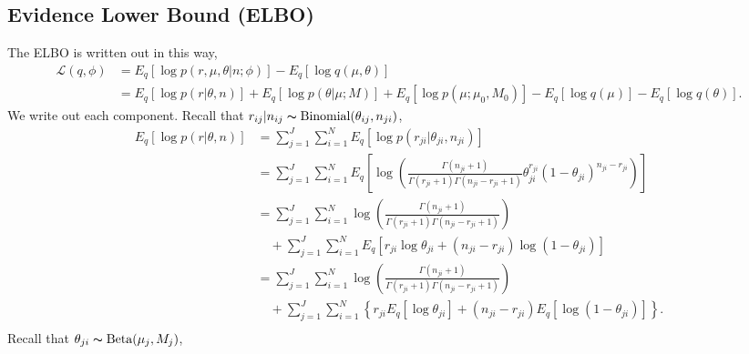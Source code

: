 \documentclass[11pt,reqno]{amsart}
\begin{document}
\subsection{Evidence Lower Bound (ELBO)}
\label{appendix:ELBO}
The ELBO is written out in this way,
\begin{equation}
\begin{split}
\label{L}
\mathcal{L}(q, \phi) &= E_q \left[ \log p\left(r,\mu,\theta | n; \phi \right)\right] - E_q \left[ \log q\left(\mu,\theta \right)\right] \\
&= E_q \left[ \log p\left(r | \theta, n \right)\right] + E_q \left[ \log p\left(\theta | \mu; M \right)\right] + E_q \left[ \log p\left(\mu ; \mu_0, M_0 \right)\right]- E_q \left[ \log q\left(\mu \right)\right]- E_q \left[ \log q\left(\theta \right)\right].
\end{split}
\end{equation}
We write out each component.
Recall that $r_{ij}|n_{ij}\thicksim \text{Binomial}(\theta_{ij}, n _{ji})$,
\begin{equation}
\begin{split}
\label{r}
E_q \left[ \log p\left(r | \theta, n \right)\right] &= \sum_{j=1}^{J} \sum_{i=1}^{N} E_q  \left[ \log p \left( r_{ji} | \theta_{ji}, n_{ji} \right) \right] \\
&= \sum_{j=1}^{J} \sum_{i=1}^{N}  E_q  \left[ \log \left( \frac{ \Gamma(n_{ji}+1) } { \Gamma(r_{ji}+1) \Gamma( n_{ji} - r_{ji} + 1 ) } \theta_{ji}^{r_{ji}} (1 - \theta_{ji})^{n_{ji} - r_{ji}} \right) \right] \\
&= \sum_{j=1}^{J} \sum_{i=1}^{N} \log \left( \frac{ \Gamma(n_{ji}+1) } { \Gamma(r_{ji}+1) \Gamma( n_{ji} - r_{ji} + 1 ) }\right)  \\
&\quad + \sum_{j=1}^{J} \sum_{i=1}^{N}  E_q  \left[ r_{ji} \log \theta_{ji} + (n_{ji} - r_{ji}) \log (1 - \theta_{ji}) \right] \\
&= \sum_{j=1}^{J} \sum_{i=1}^{N} \log \left( \frac{ \Gamma(n_{ji}+1) } { \Gamma(r_{ji}+1) \Gamma( n_{ji} - r_{ji} + 1 ) }\right)  \\
&\quad + \sum_{j=1}^{J} \sum_{i=1}^{N} \left\lbrace r_{ji} E_q \left[ \log \theta_{ji} \right] + (n_{ji} - r_{ji}) E_q  \left[  \log (1 - \theta_{ji}) \right] \right\rbrace. \\
\end{split}
\end{equation}
Recall that $\theta_{ji} \thicksim \text{Beta}(\mu_j, M_j)$,
\end{document}
